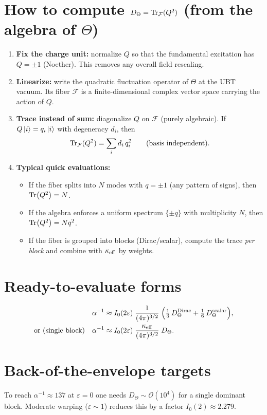 \documentclass[11pt]{article}
\newcommand{\Izero}{I_0}
\begin{document}
\section*{How to compute $D_\Theta=\Tr_{\mathcal F}(Q^2)$ (from the algebra of $\Theta$)}
\begin{enumerate}
\item \textbf{Fix the charge unit:} normalize $Q$ so that the fundamental excitation has $Q=\pm 1$ (Noether). This removes any overall field rescaling.
\item \textbf{Linearize:} write the quadratic fluctuation operator of $\Theta$ at the UBT vacuum. Its fiber $\mathcal F$ is a finite-dimensional complex vector space carrying the action of $Q$.
\item \textbf{Trace instead of sum:} diagonalize $Q$ on $\mathcal F$ (purely algebraic). If $Q\ket{i}=q_i\ket{i}$ with degeneracy $d_i$, then
\[
\Tr_{\mathcal F}(Q^2)=\sum_i d_i\,q_i^2 \qquad \text{(basis independent)}.
\]
\item \textbf{Typical quick evaluations:}
\begin{itemize}
\item If the fiber splits into $N$ modes with $q=\pm 1$ (any pattern of signs), then $\Tr(Q^2)=N$.
\item If the algebra enforces a uniform spectrum $\{\pm q\}$ with multiplicity $N$, then $\Tr(Q^2)=N q^2$.
\item If the fiber is grouped into blocks (Dirac/scalar), compute the trace \emph{per block} and combine with $\kappa_{\rm eff}$ by weights.
\end{itemize}
\end{enumerate}

\section*{Ready-to-evaluate forms}
\begin{align*}
\alpha^{-1} &\approx \Izero(2\varepsilon)\;\frac{1}{(4\pi)^{3/2}}\;\Big(\tfrac{1}{3}\,D_\Theta^{\rm Dirac}+\tfrac{1}{6}\,D_\Theta^{\rm scalar}\Big),\\
\text{or (single block)}\quad \alpha^{-1} &\approx \Izero(2\varepsilon)\;\frac{\kappa_{\rm eff}}{(4\pi)^{3/2}}\;D_\Theta.
\end{align*}

\section*{Back-of-the-envelope targets}
To reach $\alpha^{-1}\!\approx\!137$ at $\varepsilon=0$ one needs $D_\Theta \sim \mathcal O(10^4)$ for a single dominant block. Moderate warping ($\varepsilon\!\sim\!1$) reduces this by a factor $\Izero(2)\!\approx\!2.279$.
\end{document}
